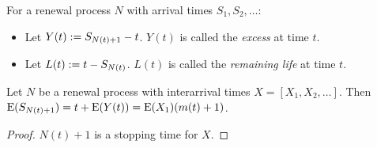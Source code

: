 \documentclass[a4paper, 12pt, fleqn]{article}
\begin{document}
\begin{definition}
For a renewal process $N$ with arrival times $S_1, S_2, \ldots$:
\begin{itemize}
\item Let $Y(t) := S_{N(t)+1}-t$. $Y(t)$ is called the \emph{excess} at time $t$.
\item Let $L(t) := t - S_{N(t)}$. $L(t)$ is called the \emph{remaining life} at time $t$.
\end{itemize}
\end{definition}

\begin{lemma}
Let $N$ be a renewal process with interarrival times $X = [X_1, X_2, \ldots]$.
Then $\operatorname*{E}(S_{N(t)+1}) = t + \operatorname*{E}(Y(t)) = \operatorname*{E}(X_1)(m(t)+1)$.
\end{lemma}
\begin{proof}
$N(t)+1$ is a stopping time for $X$.
\end{proof}
\end{document}
